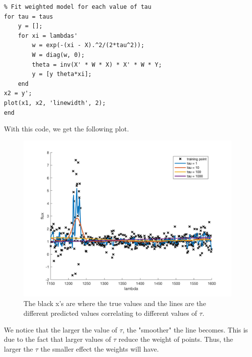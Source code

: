\documentclass[11pt,a4paper,titlepage]{article}
\begin{document}
{{{\begin{lstlisting}
% Fit weighted model for each value of tau
for tau = taus   
    y = [];
    for xi = lambdas'
        w = exp(-(xi - X).^2/(2*tau^2));
        W = diag(w, 0);
        theta = inv(X' * W * X) * X' * W * Y;
        y = [y theta*xi];
    end
x2 = y';
plot(x1, x2, 'linewidth', 2);
end
\end{lstlisting}
With this code, we get the following plot.
\begin{figure}[H]
\centering
\includegraphics[width=6.5in]{ps1_5b3}
\caption{The black x's are where the true values and the lines are the different predicted values correlating to different values of $\tau$.}
\end{figure}
We notice that the larger the value of $\tau$, the "smoother" the line becomes. This is due to the fact that larger values of $\tau$ reduce the weight of points. Thus, the larger the $\tau$ the smaller effect the weights will have.
}\label{prob:5b3}
}\label{prob:5b}
}\label{problem 5}
\end{document}
